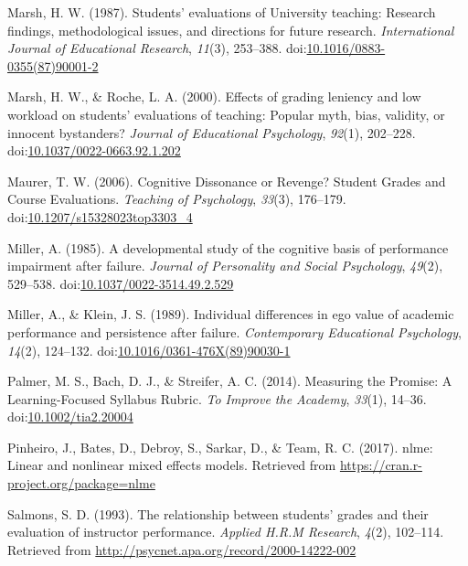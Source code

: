 \documentclass[,man]{apa6}
\theoremstyle{definition}
\theoremstyle{definition}
\theoremstyle{definition}
\theoremstyle{remark}
\begin{document}
\hypertarget{ref-Marsh1987}{}
Marsh, H. W. (1987). Students' evaluations of University teaching:
Research findings, methodological issues, and directions for future
research. \emph{International Journal of Educational Research},
\emph{11}(3), 253--388.
doi:\href{https://doi.org/10.1016/0883-0355(87)90001-2}{10.1016/0883-0355(87)90001-2}

\hypertarget{ref-Marsh2000}{}
Marsh, H. W., \& Roche, L. A. (2000). Effects of grading leniency and
low workload on students' evaluations of teaching: Popular myth, bias,
validity, or innocent bystanders? \emph{Journal of Educational
Psychology}, \emph{92}(1), 202--228.
doi:\href{https://doi.org/10.1037/0022-0663.92.1.202}{10.1037/0022-0663.92.1.202}

\hypertarget{ref-Maurer2006}{}
Maurer, T. W. (2006). Cognitive Dissonance or Revenge? Student Grades
and Course Evaluations. \emph{Teaching of Psychology}, \emph{33}(3),
176--179.
doi:\href{https://doi.org/10.1207/s15328023top3303_4}{10.1207/s15328023top3303\_4}

\hypertarget{ref-Miller1985}{}
Miller, A. (1985). A developmental study of the cognitive basis of
performance impairment after failure. \emph{Journal of Personality and
Social Psychology}, \emph{49}(2), 529--538.
doi:\href{https://doi.org/10.1037/0022-3514.49.2.529}{10.1037/0022-3514.49.2.529}

\hypertarget{ref-Miller1989}{}
Miller, A., \& Klein, J. S. (1989). Individual differences in ego value
of academic performance and persistence after failure.
\emph{Contemporary Educational Psychology}, \emph{14}(2), 124--132.
doi:\href{https://doi.org/10.1016/0361-476X(89)90030-1}{10.1016/0361-476X(89)90030-1}

\hypertarget{ref-Palmer2014}{}
Palmer, M. S., Bach, D. J., \& Streifer, A. C. (2014). Measuring the
Promise: A Learning-Focused Syllabus Rubric. \emph{To Improve the
Academy}, \emph{33}(1), 14--36.
doi:\href{https://doi.org/10.1002/tia2.20004}{10.1002/tia2.20004}

\hypertarget{ref-Pinheiro2017}{}
Pinheiro, J., Bates, D., Debroy, S., Sarkar, D., \& Team, R. C. (2017).
nlme: Linear and nonlinear mixed effects models. Retrieved from
\url{https://cran.r-project.org/package=nlme}

\hypertarget{ref-Salmons1993}{}
Salmons, S. D. (1993). The relationship between students' grades and
their evaluation of instructor performance. \emph{Applied H.R.M
Research}, \emph{4}(2), 102--114. Retrieved from
\url{http://psycnet.apa.org/record/2000-14222-002}
\end{document}
